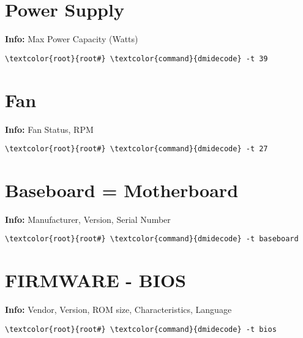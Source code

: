 \documentclass[10pt, a4paper, onecolumn, openany]{book}         %
\begin{document}
\section{Power Supply}
\textbf{Info:} Max Power Capacity (Watts)
\begin{Verbatim}[commandchars=\\\{\}]
    \textcolor{root}{root#} \textcolor{command}{dmidecode} -t 39
\end{Verbatim}

\section{Fan}
\textbf{Info:} Fan Status, RPM
\begin{Verbatim}[commandchars=\\\{\}]
    \textcolor{root}{root#} \textcolor{command}{dmidecode} -t 27
\end{Verbatim}

\section{Baseboard = Motherboard}
\textbf{Info:} Manufacturer, Version, Serial Number
\begin{Verbatim}[commandchars=\\\{\}]
    \textcolor{root}{root#} \textcolor{command}{dmidecode} -t baseboard
\end{Verbatim}

\section{FIRMWARE - BIOS}
\textbf{Info:} Vendor, Version, ROM size, Characteristics, Language
\begin{Verbatim}[commandchars=\\\{\}]
    \textcolor{root}{root#} \textcolor{command}{dmidecode} -t bios
\end{Verbatim}
\end{document}
